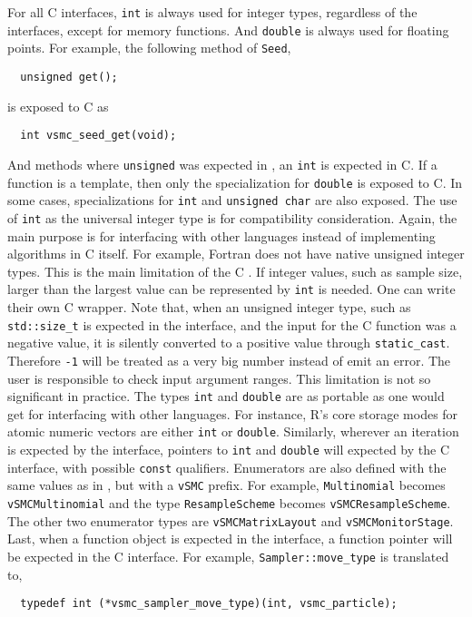For all C interfaces, \verb|int| is always used for integer types, regardless
of the \cpp interfaces, except for memory functions. And \verb|double| is
always used for floating points. For example, the following method of
\verb|Seed|,
\begin{Verbatim}
  unsigned get();
\end{Verbatim}
is exposed to C as
\begin{Verbatim}
  int vsmc_seed_get(void);
\end{Verbatim}
And \rng methods where \verb|unsigned| was expected in \cpp, an \verb|int| is
expected in C. If a function is a template, then only the specialization for
\verb|double| is exposed to C. In some cases, specializations for \verb|int|
and \verb|unsigned char| are also exposed. The use of \verb|int| as the
universal integer type is for compatibility consideration. Again, the main
purpose is for interfacing with other languages instead of implementing
algorithms in C itself. For example, Fortran does not have native unsigned
integer types. This is the main limitation of the C \api. If integer values,
such as sample size, larger than the largest value can be represented by
\verb|int| is needed. One can write their own C wrapper. Note that, when an
unsigned integer type, such as \verb|std::size_t| is expected in the \cpp
interface, and the input for the C function was a negative value, it is
silently converted to a positive value through \verb|static_cast|. Therefore
\verb|-1| will be treated as a very big number instead of emit an error. The
user is responsible to check input argument ranges. This limitation is not so
significant in practice. The types \verb|int| and \verb|double| are as portable
as one would get for interfacing with other languages. For instance, R's core
storage modes for atomic numeric vectors are either \verb|int| or
\verb|double|. Similarly, wherever an iteration is expected by the \cpp
interface, pointers to \verb|int| and \verb|double| will expected by the C
interface, with possible \verb|const| qualifiers. Enumerators are also defined
with the same values as in \cpp, but with a \verb|vSMC| prefix. For example,
\verb|Multinomial| becomes \verb|vSMCMultinomial| and the type
\verb|ResampleScheme| becomes \verb|vSMCResampleScheme|. The other two
enumerator types are \verb|vSMCMatrixLayout| and \verb|vSMCMonitorStage|.
Last, when a function object is expected in the \cpp interface, a function
pointer will be expected in the C interface. For example,
\verb|Sampler::move_type| is translated to,
\begin{Verbatim}
  typedef int (*vsmc_sampler_move_type)(int, vsmc_particle);
\end{Verbatim}

